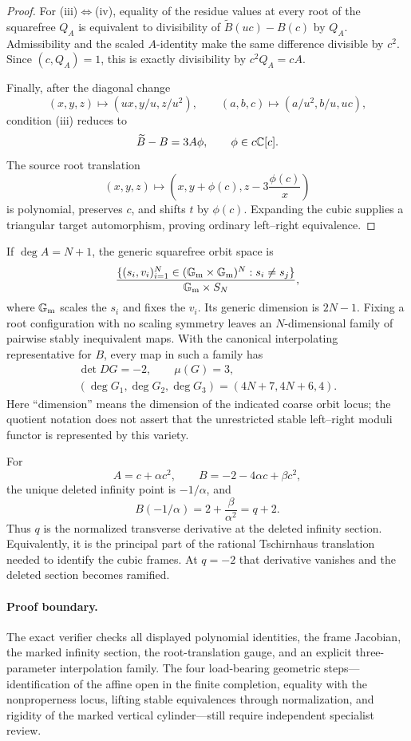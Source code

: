 \begin{proof}
For (iii)\(\Leftrightarrow\)(iv), equality of the residue values at every
root of the squarefree \(Q_A\) is equivalent to divisibility of
\(\widetilde B(uc)-B(c)\) by \(Q_A\).  Admissibility and the scaled
\(A\)-identity make the same difference divisible by \(c^2\).  Since
\((c,Q_A)=1\), this is exactly divisibility by \(c^2Q_A=cA\).

Finally, after the diagonal change
\[
(x,y,z)\mapsto(ux,y/u,z/u^2),\qquad
(a,b,c)\mapsto(a/u^2,b/u,uc),
\]
condition (iii) reduces to
\[
\widetilde B-B=3A\phi,\qquad \phi\in c\mathbb C[c].
\]
The source root translation
\[
(x,y,z)\mapsto
\left(x,y+\phi(c),z-3\frac{\phi(c)}x\right)
\]
is polynomial, preserves \(c\), and shifts \(t\) by \(\phi(c)\).
Expanding the cubic supplies a triangular target automorphism, proving
ordinary left--right equivalence.
\end{proof}

\begin{corollary}
\label{cor:large-stable-moduli}
If \(\deg A=N+1\), the generic squarefree orbit space is
\[
\frac{
\{(s_i,v_i)_{i=1}^N\in(\mathbb G_{\mathrm m}\times\mathbb G_{\mathrm m})^N:s_i\ne s_j\}
}{\mathbb G_{\mathrm m}\times S_N},
\]
where \(\mathbb G_{\mathrm m}\) scales the \(s_i\) and fixes the \(v_i\).  Its generic
dimension is \(2N-1\).  Fixing a root configuration with no scaling symmetry
leaves an \(N\)-dimensional family of pairwise stably inequivalent maps.
With the canonical interpolating representative for \(B\), every map in
such a family has
\[
\begin{gathered}
\det DG=-2,\qquad \mu(G)=3,\\
(\deg G_1,\deg G_2,\deg G_3)=(4N+7,4N+6,4).
\end{gathered}
\]
Here ``dimension'' means the dimension of the indicated coarse orbit locus;
the quotient notation does not assert that the unrestricted stable
left--right moduli functor is represented by this variety.
\end{corollary}

\begin{remark}
For
\[
A=c+\alpha c^2,\qquad B=-2-4\alpha c+\beta c^2,
\]
the unique deleted infinity point is \(-1/\alpha\), and
\[
B(-1/\alpha)=2+\frac{\beta}{\alpha^2}=q+2.
\]
Thus \(q\) is the normalized transverse derivative at the deleted infinity
section.  Equivalently, it is the principal part of the rational
Tschirnhaus translation needed to identify the cubic frames.  At \(q=-2\)
that derivative vanishes and the deleted section becomes ramified.
\end{remark}

\paragraph{Proof boundary.}
The exact verifier checks all displayed polynomial identities, the frame
Jacobian, the marked infinity section, the root-translation gauge, and an
explicit three-parameter interpolation family.  The four load-bearing
geometric steps---identification of the affine open in the finite
completion, equality with the nonproperness locus, lifting stable
equivalences through normalization, and rigidity of the marked vertical
cylinder---still require independent specialist review.

